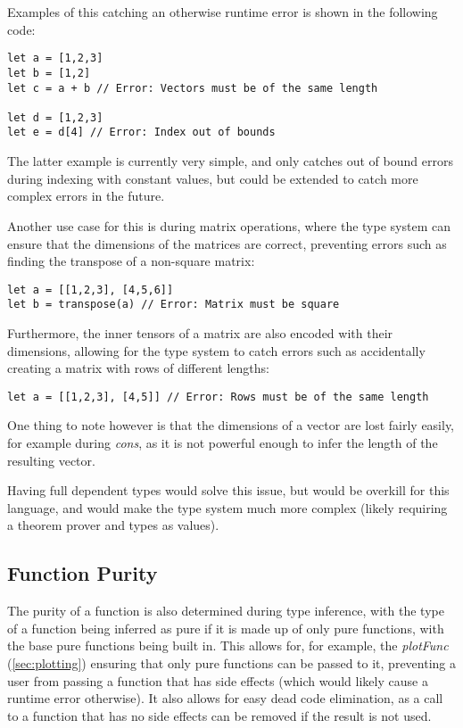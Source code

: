 Examples of this catching an otherwise runtime error is shown in the following code:

\begin{verbatim}
let a = [1,2,3]
let b = [1,2]
let c = a + b // Error: Vectors must be of the same length
    
let d = [1,2,3]
let e = d[4] // Error: Index out of bounds
\end{verbatim}

The latter example is currently very simple, and only catches out of bound errors during indexing with constant
values, but could be extended to catch more complex errors in the future.

Another use case for this is during matrix operations, where the type system can ensure that the dimensions of the
matrices are correct, preventing errors such as finding the transpose of a non-square matrix:

\begin{verbatim}
let a = [[1,2,3], [4,5,6]]
let b = transpose(a) // Error: Matrix must be square
\end{verbatim}

Furthermore, the inner tensors of a matrix are also encoded with their dimensions, allowing for the type system to catch
errors such as accidentally creating a matrix with rows of different lengths:

\begin{verbatim}
let a = [[1,2,3], [4,5]] // Error: Rows must be of the same length
\end{verbatim}

One thing to note however is that the dimensions of a vector are lost fairly easily, for example during 
\textit{cons}, as it is not powerful enough to infer the length of the resulting vector.

Having full dependent types would solve this issue, but would be overkill for this language, and would make the
type system much more complex (likely requiring a theorem prover and types as values).

\subsection{Function Purity}\label{subsec:function-purity}

The purity of a function is also determined during type inference, with the type of a function being inferred as
pure if it is made up of only pure functions, with the base pure functions being built in.
This allows for, for example, the \textit{plotFunc} (\ref{sec:plotting}) ensuring that only pure functions can be 
passed to it, preventing a user from passing a function that has side effects (which would likely cause a runtime 
error otherwise).
It also allows for easy dead code elimination, as a call to a function that has no side effects can be removed if the
result is not used.

